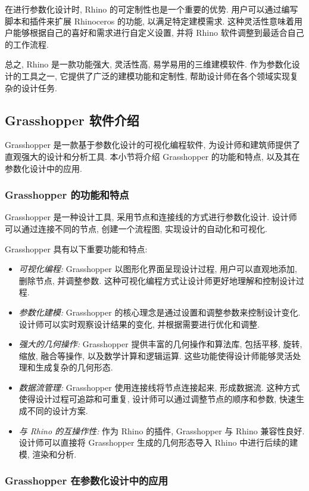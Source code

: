 在进行参数化设计时, Rhino 的可定制性也是一个重要的优势.
用户可以通过编写脚本和插件来扩展 Rhinoceros 的功能, 以满足特定建模需求.
这种灵活性意味着用户能够根据自己的喜好和需求进行自定义设置, 并将 Rhino 软件调整到最适合自己的工作流程.

总之, Rhino 是一款功能强大, 灵活性高, 易学易用的三维建模软件.
作为参数化设计的工具之一, 它提供了广泛的建模功能和定制性, 帮助设计师在各个领域实现复杂的设计任务.

\subsection{Grasshopper 软件介绍}

Grasshopper 是一款基于参数化设计的可视化编程软件, 为设计师和建筑师提供了直观强大的设计和分析工具.
本小节将介绍 Grasshopper 的功能和特点, 以及其在参数化设计中的应用.

\subsubsection{Grasshopper 的功能和特点}

Grasshopper 是一种设计工具, 采用节点和连接线的方式进行参数化设计.
设计师可以通过连接不同的节点, 创建一个流程图, 实现设计的自动化和可视化.

Grasshopper 具有以下重要功能和特点:
\begin{itemize}
  \item \emph{可视化编程:} Grasshopper 以图形化界面呈现设计过程, 用户可以直观地添加, 删除节点, 并调整参数.
        这种可视化编程方式让设计师更好地理解和控制设计过程.
  \item \emph{参数化建模:} Grasshopper 的核心理念是通过设置和调整参数来控制设计变化.
        设计师可以实时观察设计结果的变化, 并根据需要进行优化和调整.
  \item \emph{强大的几何操作:} Grasshopper 提供丰富的几何操作和算法库, 包括平移, 旋转, 缩放, 融合等操作, 以及数学计算和逻辑运算.
        这些功能使得设计师能够灵活处理和生成复杂的几何形态.
  \item \emph{数据流管理:} Grasshopper 使用连接线将节点连接起来, 形成数据流.
        这种方式使得设计过程可追踪和可重复, 设计师可以通过调整节点的顺序和参数, 快速生成不同的设计方案.
  \item \emph{与 Rhino 的互操作性:} 作为 Rhino 的插件, Grasshopper 与 Rhino 兼容性良好.
        设计师可以直接将 Grasshopper 生成的几何形态导入 Rhino 中进行后续的建模, 渲染和分析.
\end{itemize}

\subsubsection{Grasshopper 在参数化设计中的应用}

